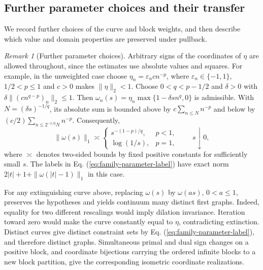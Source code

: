\documentclass[11pt]{article}
\theoremstyle{definition}
\theoremstyle{remark}
\newtheorem{remark}{Remark}
\begin{document}
\subsection{Further parameter choices and their transfer}
\label{subsec:appendix-parameter-transfer}

We record further choices of the curve and block weights, and then describe which value and domain properties are preserved under pullback.

\begin{remark}[Further parameter choices]
Arbitrary signs of the coordinates of $\eta$ are allowed throughout, since the estimates use absolute values and squares. For example, in the unweighted case choose $\eta_n=\varepsilon_nc n^{-p}$, where $\varepsilon_n\in\{-1,1\}$, $1/2<p\le1$ and $c>0$ makes $\|\eta\|_2<1$. Choose $0<q<p-1/2$ and $\delta>0$ with $\delta\|(c n^{q-p})_n\|_2\le1$. Then $\omega_n(s)=\eta_n\max\{1-\delta s n^q,0\}$ is admissible. With $N=(\delta s)^{-1/q}$, its absolute sum is bounded above by $c\sum_{n\le N}n^{-p}$ and below by $(c/2)\sum_{n\le2^{-1/q}N}n^{-p}$. Consequently,
\[
\|\omega(s)\|_1\asymp
\begin{cases}
s^{-(1-p)/q},&p<1,\\
\log(1/s),&p=1,
\end{cases}
\qquad s\downarrow0,
\]
where $\asymp$ denotes two-sided bounds by fixed positive constants for sufficiently small $s$. The labels in Eq. (\ref{eq:family-parameter-label}) have exact norm $2|t|+1+\|\omega(|t|-1)\|_1$ in this case.

For any extinguishing curve above, replacing $\omega(s)$ by $\omega(as)$, $0<a\le1$, preserves the hypotheses and yields continuum many distinct first graphs. Indeed, equality for two different rescalings would imply dilation invariance. Iteration toward zero would make the curve constantly equal to $\eta$, contradicting extinction. Distinct curves give distinct constraint sets by Eq. (\ref{eq:family-parameter-label}), and therefore distinct graphs. Simultaneous primal and dual sign changes on a positive block, and coordinate bijections carrying the ordered infinite blocks to a new block partition, give the corresponding isometric coordinate realizations.


\end{remark}
\end{document}
